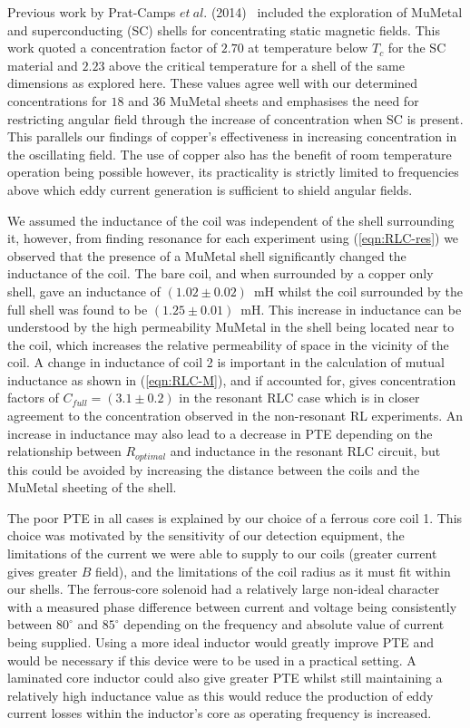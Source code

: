 \documentclass[11pt]{iopart}
\begin{document}
Previous work by Prat-Camps $et~al.$ (2014)~\cite{N2014} included the exploration of
MuMetal and superconducting (SC) shells for concentrating static
magnetic fields. This work quoted a concentration factor of $2.70$ at
temperature below $T_c$ for the SC material and $2.23$ above the
critical temperature for a shell of the same dimensions as explored
here. These values agree well with our determined concentrations for $18$
and $36$ MuMetal sheets and emphasises the need for restricting angular
field through the increase of concentration when SC is present. This
parallels our findings of copper's effectiveness in increasing
concentration in the oscillating field. The use of copper also has the
benefit of room temperature operation being possible however, its
practicality is strictly limited to frequencies above which eddy
current generation is sufficient to shield angular fields. 

We assumed the inductance of the coil was independent of the shell
surrounding it, however, from finding resonance for each experiment
using (\ref{eqn:RLC-res}) we
observed that the presence of a MuMetal shell significantly changed
the inductance of the coil. The bare coil, and when surrounded by a
copper only shell, gave an inductance of $(1.02\pm0.02)$~mH whilst the
coil surrounded by the full shell was found to be $(1.25\pm0.01)$~mH.
This increase in inductance can be understood by the high permeability
MuMetal in the shell being located near to the coil, which increases
the relative permeability of space in the vicinity of the coil. A
change in inductance of coil 2 is important in the calculation of
mutual inductance as shown in (\ref{eqn:RLC-M}), and if
accounted for, gives concentration factors of $C_{full}=(3.1\pm0.2)$ in
the resonant RLC case which is in closer agreement to the concentration
observed in the non-resonant RL experiments. An increase in inductance may also
lead to a decrease in PTE depending on the relationship between
$R_{optimal}$ and inductance in the resonant RLC circuit, but this could be
avoided by increasing the distance between the coils and the MuMetal
sheeting of the shell.

The poor PTE in all cases is explained by our choice of a ferrous
core coil 1. This choice was motivated by the sensitivity of our
detection equipment, the limitations of the current we were able to
supply to our coils (greater current gives greater $B$ field), and the
limitations of the coil radius as it must fit within our shells. The
ferrous-core solenoid had a relatively large non-ideal character with
a measured phase difference between current and voltage being
consistently between $80^\circ$ and $85^\circ$ depending on the
frequency and absolute value of current being supplied. Using a more
ideal inductor would greatly improve PTE and would be necessary if
this device were to be used in a practical setting. A laminated core
inductor could also give greater PTE whilst still maintaining a
relatively high inductance value as this would reduce the production
of eddy current losses within the inductor's core as operating
frequency is increased. 
\end{document}
